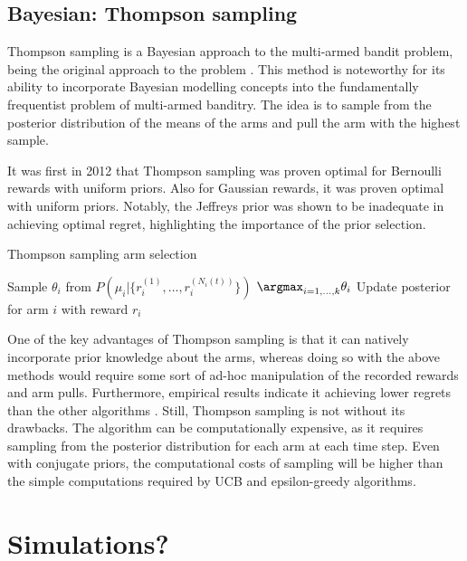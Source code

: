 \subsection{Bayesian: Thompson sampling}
Thompson sampling is a Bayesian approach to the multi-armed bandit problem, being the original approach to the problem \cite{thompson1933}.
This method is noteworthy for its ability to incorporate Bayesian modelling concepts into the fundamentally frequentist problem of multi-armed banditry.
The idea is to sample from the posterior distribution of the means of the arms and pull the arm with the highest sample.

It was first in 2012 that Thompson sampling was proven optimal for Bernoulli rewards \cite{kaufmann2012} with uniform priors.
Also for Gaussian rewards, it was proven optimal \cite{honda2014} with uniform priors.
Notably, the Jeffreys prior was shown to be inadequate in achieving optimal regret, highlighting the importance of the prior selection.

\begin{algorithm}
    \caption{Thompson sampling arm selection}
    \label{alg:thompson}
    \begin{algorithmic}
        \State Sample $\theta_i$ from $P(\mu_i | \{r_i^{(1)}, \dots, r_i^{(N_i(t))}\})$
        \EndFor
        \State \Return $\argmax_{i=1,\dots,k} \theta_i$
        \State Update posterior for arm $i$ with reward $r_i$
    \end{algorithmic}
\end{algorithm}

One of the key advantages of Thompson sampling is that it can natively incorporate prior knowledge about the arms, whereas doing so with the above methods would require some sort of ad-hoc manipulation of the recorded rewards and arm pulls.
Furthermore, empirical results indicate it achieving lower regrets than the other algorithms \cite{kaufmann2012}.
Still, Thompson sampling is not without its drawbacks.
The algorithm can be computationally expensive, as it requires sampling from the posterior distribution for each arm at each time step.
Even with conjugate priors, the computational costs of sampling will be higher than the simple computations required by UCB and epsilon-greedy algorithms.

\section{Simulations?}